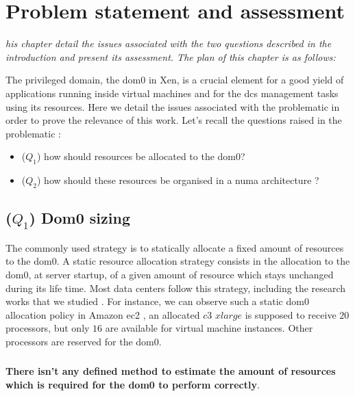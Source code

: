 \chapter{Problem statement and assessment}
\label{chap:probass}
\textit{his chapter detail the issues associated with the two questions described in the introduction and present its assessment. The plan of this chapter is as follows:
}
\minitoc

\newpage

The privileged domain, the dom0 in Xen, is a crucial element for a good yield of applications running inside virtual machines and for the \glspl{dc} management tasks using its resources. Here we detail the issues associated with the problematic in order to prove the relevance of this work. Let's recall the questions raised in the problematic : 

\begin{itemize}
    \item ($Q_1$) how should resources be allocated to the dom0? 
    \item ($Q_2$) how should these resources be organised in a \acrshort{numa} architecture ? 
\end{itemize}

\section{($Q_1$) Dom0 sizing}

The commonly used strategy is to statically allocate a fixed amount of resources to the dom0. A static resource allocation strategy consists in the allocation to the dom0, at server startup, of a given amount of resource which stays unchanged during its life time. Most data centers follow this strategy, including the research works that we studied \citep{livemigration,livemigration2,work01,work02,work03,work04}. For instance, we can observe such a static dom0 allocation policy in Amazon \acrshort{ec2} \citep{aws-ec2}, an allocated $c3$ $xlarge$ is supposed to receive $20$ processors, but only $16$ are available for virtual machine instances. Other processors are reserved for the dom0. 

\paragraph{}
\begin{bidentidad2}
\centering \textbf{There isn't any defined method to estimate the amount of resources which is required for the dom0 to perform correctly}. 
\end{bidentidad2}

